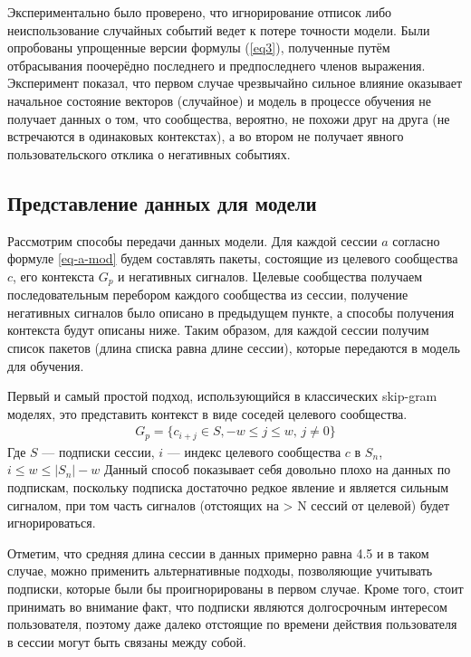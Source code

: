 \documentclass[times,specification,annotation]{itmo-student-thesis}
\begin{document}
Экспериментально было проверено, что игнорирование отписок либо неиспользование случайных событий ведет к потере точности модели. Были опробованы упрощенные версии формулы (\ref{eq3}), полученные путём отбрасывания
поочерёдно последнего и предпоследнего членов выражения. Эксперимент показал, что первом случае чрезвычайно сильное
влияние оказывает начальное состояние векторов (случайное) и модель в процессе обучения не получает данных о том, что сообщества, вероятно,
не похожи друг на друга (не встречаются в одинаковых контекстах), а во втором не получает явного пользовательского отклика о негативных событиях. 

\subsection{Представление данных для модели}\label{sec:dataf}

Рассмотрим способы передачи данных модели. Для каждой сессии $a$ согласно формуле \ref{eq-a-mod} будем составлять пакеты, состоящие из целевого сообщества $c$, его контекста $G_p$ и негативных сигналов. Целевые сообщества получаем последовательным перебором каждого сообщества из сессии, получение негативных сигналов было описано в предыдущем пункте, а способы получения контекста будут описаны ниже. Таким образом, для каждой сессии получим список пакетов (длина списка равна длине сессии), которые передаются в модель для обучения.

Первый и самый простой подход, использующийся в классических skip-gram моделях, это представить контекст в виде соседей целевого сообщества. 
\begin{align}
G_p =\{c_{i + j} \in S, -w \leq j \leq w,\, j \ne 0\} \label{eq4}
\end{align}
Где $S$ --- подписки сессии, $i$ --- индекс целевого сообщества $c$ в $S_n$, $i \leq w \leq |S_n| - w$
Данный способ показывает себя довольно плохо на данных по подпискам, поскольку подписка
достаточно редкое явление и является сильным сигналом, при том часть сигналов
(отстоящих на > N сессий от целевой) будет игнорироваться.

Отметим, что средняя длина сессии в данных примерно равна 4.5 и в таком случае, можно применить альтернативные подходы, позволяющие учитывать подписки, которые были бы проигнорированы в первом случае. Кроме того, стоит принимать во внимание факт, что подписки являются долгосрочным интересом пользователя, поэтому даже далеко отстоящие по времени действия пользователя в сессии могут быть связаны между собой.
\end{document}
